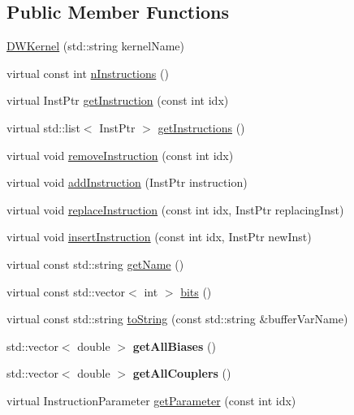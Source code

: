 \subsection*{Public Member Functions}
\begin{DoxyCompactItemize}
\item 
\hyperlink{a01221_a76a4dfadb973abbc93d1afefc6839ad8}{D\+W\+Kernel} (std\+::string kernel\+Name)
\item 
virtual const int \hyperlink{a01221_a79aecc7419a20b8779372ef36fc24806}{n\+Instructions} ()
\item 
virtual Inst\+Ptr \hyperlink{a01221_a00f23cd2e15ea6b9d00d4f3dbe1540f8}{get\+Instruction} (const int idx)
\item 
virtual std\+::list$<$ Inst\+Ptr $>$ \hyperlink{a01221_abbb8f2b1c78623c377524e45d581d018}{get\+Instructions} ()
\item 
virtual void \hyperlink{a01221_af2bcfd679e6cb89194f3f0bff8622b99}{remove\+Instruction} (const int idx)
\item 
virtual void \hyperlink{a01221_a4c3043d6971999c3a09e797fc55deb6c}{add\+Instruction} (Inst\+Ptr instruction)
\item 
virtual void \hyperlink{a01221_a75eb3560d2f81c9a5ae1cf765deb0e83}{replace\+Instruction} (const int idx, Inst\+Ptr replacing\+Inst)
\item 
virtual void \hyperlink{a01221_a1627af0141f70fc4a3cd500a13fb31b8}{insert\+Instruction} (const int idx, Inst\+Ptr new\+Inst)
\item 
virtual const std\+::string \hyperlink{a01221_a7f0c4d3c73029566561cf56a474bcbbd}{get\+Name} ()
\item 
virtual const std\+::vector$<$ int $>$ \hyperlink{a01221_adae68964db6acd8b4c2267c270a8ec58}{bits} ()
\item 
virtual const std\+::string \hyperlink{a01221_adbc3fdd080ebba20bc620b8832979f16}{to\+String} (const std\+::string \&buffer\+Var\+Name)
\item 
\mbox{\label{a01221_a9ee05b3d7689bbf837bdb7737f9745f4}} 
std\+::vector$<$ double $>$ {\bfseries get\+All\+Biases} ()
\item 
\mbox{\label{a01221_a7df03ecec9c1821433daa3aa092cbd4d}} 
std\+::vector$<$ double $>$ {\bfseries get\+All\+Couplers} ()
\item 
virtual Instruction\+Parameter \hyperlink{a01221_a81711b7db284aba35d6952e4d1d15d41}{get\+Parameter} (const int idx)
\item 

\end{DoxyCompactItemize}
